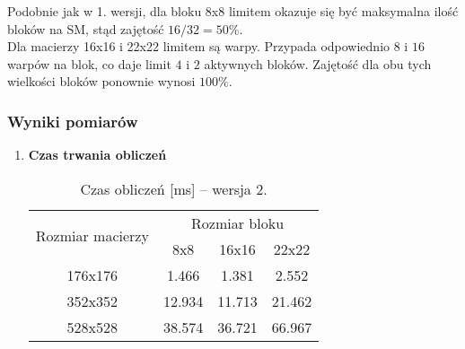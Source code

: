 Podobnie jak w 1. wersji, dla bloku 8x8 limitem okazuje się być maksymalna ilość bloków na SM, stąd zajętość $ 16 / 32 = 50\% $. \\
Dla macierzy 16x16 i 22x22 limitem są warpy. Przypada odpowiednio $ 8 $ i $ 16 $ warpów na blok, co daje limit $ 4 $ i $ 2 $ aktywnych bloków. Zajętość dla obu tych wielkości bloków ponownie wynosi $ 100\% $.

\subsubsection{Wyniki pomiarów}

\begin{enumerate}

\item \textbf{Czas trwania obliczeń} \newline

\begin{table}[H]
\centering
\begin{tabular}{|c|c|c|c|}
\hline
\multirow{2}{*}{Rozmiar macierzy} & \multicolumn{3}{c|}{Rozmiar bloku} \\ \cline{2-4}
& 8x8 & 16x16 & 22x22 \\ \hline
176x176 & 1.466 & 1.381 & 2.552 \\ \hline
352x352 & 12.934 & 11.713 & 21.462 \\ \hline
528x528 & 38.574 & 36.721 & 66.967 \\ \hline
\end{tabular}
\caption{Czas obliczeń [ms] -- wersja 2.}
\end{table}

\begin{figure}[H]
\centering
\end{figure}
\end{enumerate}
